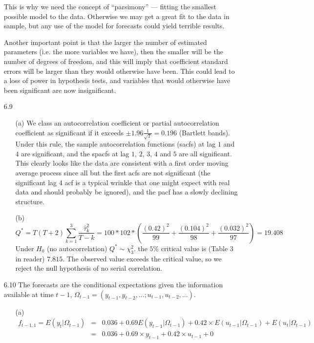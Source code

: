 \documentclass[11pt,a4paper]{article}
\begin{document}
\begin{itemize}
This is why we need
the concept of ``parsimony'' --- fitting the smallest possible model to the data.
Otherwise we may get a great fit to the data in sample, but any use of the
model for forecasts could yield terrible results.

Another important point is
that the larger the number of estimated parameters (i.e. the more variables we
have), then the smaller will be the number of degrees of freedom, and this will
imply that coefficient standard errors will be larger than they would otherwise
 have been. This could lead to a loss of power in hypothesis tests, and
variables that would otherwise have been significant are now insignificant.
\item[6.9]
\begin{itemize}
\item[(a)] We class an autocorrelation coefficient or partial autocorrelation
coefficient as  significant if it exceeds $\pm 1.96 \frac{1}{\sqrt{T}}=0.196$ (Bartlett bands). Under this rule, the sample autocorrelation functions (sacfs) at lag
 $1$ and $4$ are
significant, and the spacfs at lag $1$, $2$, $3$, $4$ and $5$ are all significant. This
clearly looks like the data are consistent with a first order moving average
process since all but the first acfs are not significant (the significant lag
$4$ acf is a typical wrinkle that one might expect with real data and should
probably be ignored), and the pacf has a slowly declining structure.
\item[(b)]
$$
 Q^* = T(T+2) \sum_{k=1}^3 \frac{\hat \tau^2_k}{T-k} = 100*102*\left(
\frac{(0.42)^2}{99}+\frac{(0.104)^2}{98}+\frac{(0.032)^2}{97}
\right) = 19.408
$$
Under $H_0$ (no autocorrelation) $Q^* \sim \chi^2_3$. the $5\%$ critical
value is (Table 3 in reader) $7.815$. The observed value exceeds the critical
value, so we reject the null hypothesis of no serial correlation.
\end{itemize}
\item[6.10]
The forecasts are the conditional expectations given the information
available at time $t-1$, $\Omega_{t-1} = (y_{t-1}, y_{t-2}, \ldots ; u_{t-1}, u_{t-2}, \ldots)$.
\begin{itemize}
\item[(a)]
$$
\begin{array}{rcl}
 f_{t-1,1} = E(y_t|\Omega_{t-1}) & = & 0.036 +0.69 E(y_{t-1}|\Omega_{t-1}) + 0.42\times E(u_{t-1}| \Omega_{t-1}) + E(u_t| \Omega_{t-1}) \\
 & = & 0.036 +0.69 \times y_{t-1} + 0.42\times u_{t-1} + 0 \\

\end{array}$$
\end{itemize}
\end{itemize}
\end{document}

